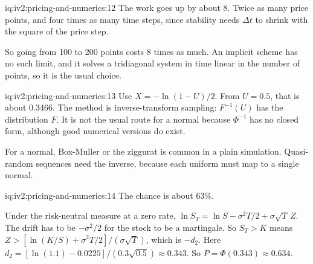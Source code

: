 \begin{solution}{iq:iv2:pricing-and-numerics:12}
The work goes up by about 8. Twice as many price points, and four times as many time steps, since stability needs $\Delta t$ to shrink with the square of the price step.

So going from 100 to 200 points costs 8 times as much. An implicit scheme has no such limit, and it solves a tridiagonal system in time linear in the number of points, so it is the usual choice.

\end{solution}

\begin{solution}{iq:iv2:pricing-and-numerics:13}
Use $X = -\ln(1 - U)/2$. From $U = 0.5$, that is about 0.3466. The method is inverse-transform sampling: $F^{-1}(U)$ has the distribution $F$. It is not the usual route for a normal because $\Phi^{-1}$ has no closed form, although good numerical versions do exist.

For a normal, Box-Muller or the ziggurat is common in a plain simulation. Quasi-random sequences need the inverse, because each uniform must map to a single normal.

\end{solution}

\begin{solution}{iq:iv2:pricing-and-numerics:14}
The chance is about 63\%.

Under the risk-neutral measure at a zero rate, $\ln S_T = \ln S - \sigma^2T/2 + \sigma\sqrt T\,Z$. The drift has to be $-\sigma^2/2$ for the stock to be a martingale. So $S_T > K$ means $Z > [\ln(K/S) + \sigma^2T/2]/(\sigma\sqrt T)$, which is $-d_2$. Here $d_2 = [\ln(1.1) - 0.0225]/(0.3\sqrt{0.5}) \approx 0.343$. So $P = \Phi(0.343) \approx 0.634$.

\end{solution}


